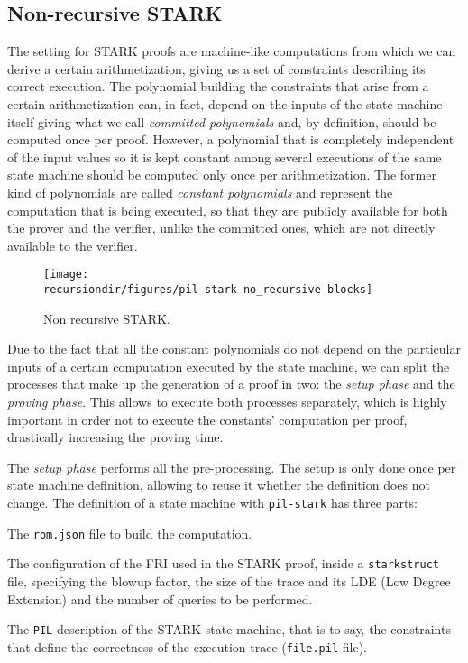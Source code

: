\subsection{Non-recursive STARK \label{subsec:non_recursive_STARK}}

The setting for STARK proofs are machine-like computations from which we can derive a certain arithmetization, 
giving us a set of constraints describing its correct execution. 
The polynomial building the constraints that arise from a certain arithmetization can, 
in fact, depend on the inputs of the state machine itself giving what we call \textit{committed polynomials} and, 
by definition, should be computed once per proof. 
However, a polynomial that is completely independent of the input values so it is kept constant among several executions of the same state machine should be computed only once per arithmetization. 
The former kind of polynomials are called \textit{constant polynomials} and represent the computation that is being executed, so that they are publicly available for both the prover and the verifier, unlike the committed ones, which are not directly available to the verifier.


\begin{figure}[H]
\centering
\texttt{[image: \\recursiondir/figures/pil-stark-no\_recursive-blocks]}
\caption{Non recursive STARK.}
\label{fig:non-recursive}
\end{figure}

Due to the fact that all the constant polynomials do not depend on the particular inputs of a certain computation executed by the state machine, we can split the processes that make up the generation of a proof in two: the \textit{setup phase} and the \textit{proving phase}. 
This allows to execute both processes separately, which is highly important in order not to execute the constants' computation per proof, drastically increasing the proving time. 

The \textit{setup phase} performs all the pre-processing. 
The setup is only done once per state machine definition, allowing to reuse it whether the definition does not change. 
The definition of a state machine with \texttt{pil-stark} has three parts:

\begin{compactitem}
\item The \texttt{rom.json} file to build the computation.
\item The configuration of the FRI used in the STARK proof, inside a \texttt{starkstruct} file, specifying the blowup factor, the size of the trace and its LDE (Low Degree Extension) and the number of queries to be performed.
\item The \texttt{PIL} description of the STARK state machine, that is to say, the constraints that define the correctness of the execution trace (\texttt{file.pil} file).
\end{compactitem}

